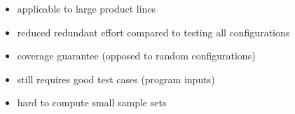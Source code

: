 \begin{frame}{\myframetitle}
{{\begin{itemize}
				\setlength\itemsep{.4em}
				\item applicable to large product lines
				\item reduced redundant effort compared to testing all configurations
				\item coverage guarantee (opposed to random configurations)
				\item still requires good test cases (program inputs)
				\item hard to compute small sample sets
			\end{itemize}
		}
	}
\end{frame}

\newcommand{\pair}[2]{$#1 \wedge #2$ & $#1 \wedge \neg #2$ & $\neg #1 \wedge #2$ & $\neg #1 \wedge \neg #2$\\}
\newcommand{\redandgray}[1]{\only<#1-| handout:#1->{\color{black}}\only<#1| handout:#1>{\color{blue}}}
\newcommand{\epair}[6]{
	{\redandgray{#3}$#1 \wedge #2$} & 
	{\redandgray{#4}$#1 \wedge \neg #2$} & 
	{\redandgray{#5}$\neg #1 \wedge #2$} & 
	{\redandgray{#6}$\neg #1 \wedge \neg #2$}\\
}

